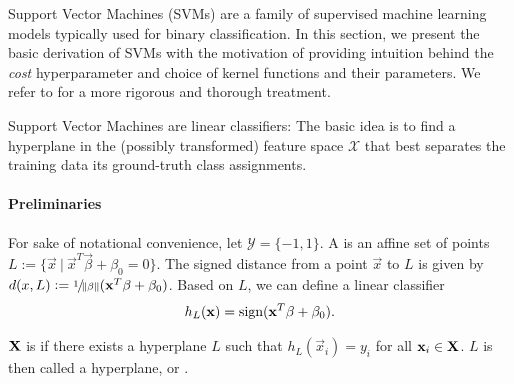 \documentclass[
	fontsize=10pt, %
	twoside=false, %
	secnumdepth=1, %
  toc=indentunnumbered %
]{kaobook}
\begin{document}

Support Vector Machines (SVMs) are a family of supervised machine learning
models typically used for binary classification. In this section, we present the
basic derivation of SVMs with the motivation of providing intuition behind the
\textit{cost} hyperparameter and choice of kernel functions and their parameters. We
refer to
\citeauthor{tibshirani_ElementsStatisticalLearning_2017}
\cite{tibshirani_ElementsStatisticalLearning_2017} for a more rigorous
and thorough treatment.

Support Vector Machines are linear classifiers: 
The basic idea is to find a hyperplane in the (possibly transformed) feature
space $\mathcal{X}$ that best separates the training data \wrt its
ground-truth class assignments.


\paragraph{Preliminaries} For sake of notational convenience, let $\mathcal{Y} =
\{-1, 1\}$. A  is an affine set of points $L := \{\vec x~|~ \vec
x^T \vec \beta + \beta_0 = 0\}$. The signed distance from a point $\vec x$ to $L$ is
given by $d(x, L) := \nicefrac{1}{\norm\beta} (\mathbf{x}^T \mathbf{\beta} + \beta_0)$. Based
on $L$, we can define a linear classifier
\begin{align}
  h_L(\mathbf{x}) = \text{sign}(\mathbf{x}^T \mathbf{\beta} + \beta_0).
  \label{eq:linear-classifier}
\end{align}

$\mathbf{X}$ is  if there exists a hyperplane
$L$ such that $h_L(\vec x_i) = y_i$ for all $\mathbf{x}_i \in \mathbf{X}$. $L$ is then
called a  hyperplane, or .
\end{document}

